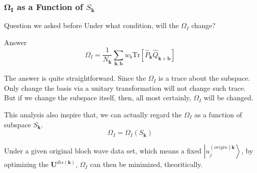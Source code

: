 \documentclass{beamer}
\begin{document}
  \begin{frame}
    \frametitle{\(\mathbf{\Omega_I}\) as a Function of \(S_\mathbf{k}\)}

    \begin{alertblock}{Question we asked before}
      Under what condition, will the \(\Omega_I\) change?
    \end{alertblock}
    
    \begin{block}{Answer}
      \small
      \begin{equation*}
        \Omega_I = \dfrac{1}{N_\mathbf{k}}\sum_{\mathbf{k},\mathbf{b}}w_b{}\mathrm{Tr}\left[\widehat{P}_{\mathbf{k}}\widehat{Q}_{\mathbf{k}+\mathbf{b}} \right]
      \end{equation*}
      
      The answer is quite straightforward. Since the \(\Omega_I\) is a trace about the subspace. Only change the basis via a unitary transformation will not change such trace. But if we change the subspace itself, then, all most certainly, \(\Omega_I\) will be changed.

      This analysis also inspire that, {\color{purple} we can actually regard the \(\Omega_I\) as a function of subspace \(S_\mathbf{k}\).}
      \begin{equation*}
        \Omega_I = \Omega_I(S_\mathbf{k})
      \end{equation*}

      Under a given original bloch wave data set, which means a fixed \(\left|u_j^{(origin)\mathbf{k}}\right\rangle\), by optimizing the \(\mathbf{U}^{dis(\mathbf{k})}\), \(\Omega_I\) can then be minimized, theoritically. 
    \end{block}

  \end{frame}
\end{document}
